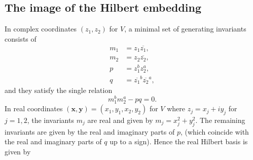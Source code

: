 \documentclass[twoside]{amsart}
\theoremstyle{definition}
\theoremstyle{remark}
\numberwithin{equation}{section}
\begin{document}

\subsection{The image of the Hilbert embedding}
\label{subsec:S1-ab_ImageHilb}

In complex coordinates $(z_1, z_2)$ for $V$, a minimal set of generating invariants consists of
\begin{equation}
\label{eq:S1-ab_CInvars}
\begin{split}
    m_1 &=      z_1 \overline{z_1},
    \\
    m_2 &=      z_2 \overline{z_2},
    \\
    p &=      z_1^b z_2^a,
    \\
    q &=      \overline{z_1}^b \overline{z_2}^a,
\end{split}
\end{equation}
and they satisfy the single relation
\begin{equation}
\label{eq:S1-ab_CRelat}
    m_1^b m_2^a -   p q = 0.
\end{equation}
In real coordinates $(\mathbf{x}, \mathbf{y}) = (x_1, y_1, x_2, y_2)$ for $V$ where $z_j = x_j + i y_j$ for $j = 1,2$,
the invariants $m_j$ are real and given by $m_j = x_j^2 + y_j^2$.
The remaining invariants are given by the real and imaginary parts of $p$, (which coincide with the real and imaginary parts of
$q$ up to a sign).
Hence the real Hilbert basis is given by
\end{document}
